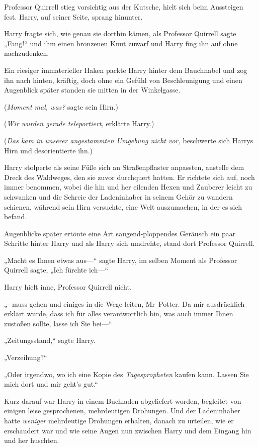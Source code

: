 {Professor Quirrell stieg vorsichtig aus der Kutsche, hielt sich beim Aussteigen fest. Harry, auf seiner Seite, sprang hinunter.

Harry fragte sich, wie genau sie dorthin kämen, als Professor Quirrell sagte „Fang!“ und ihm einen bronzenen Knut zuwarf und Harry fing ihn auf ohne nachzudenken.

Ein riesiger immaterieller Haken packte Harry hinter dem Bauchnabel und zog ihn nach hinten, kräftig, doch ohne ein Gefühl von Beschleunigung und einen Augenblick später standen sie mitten in der Winkelgasse.

(\emph{Moment mal, was?} sagte sein Hirn.)

(\emph{Wir wurden gerade teleportiert,} erklärte Harry.)

(\emph{Das kam in unserer angestammten Umgebung nicht vor,} beschwerte sich Harrys Hirn und desorientierte ihn.)

Harry stolperte als seine Füße sich an Straßenpflaster anpassten, anstelle dem Dreck des Waldweges, den sie zuvor durchquert hatten. Er richtete sich auf, noch immer benommen, wobei die hin und her eilenden Hexen und Zauberer leicht zu schwanken und die Schreie der Ladeninhaber in seinem Gehör zu wandern schienen, während sein Hirn versuchte, eine Welt auszumachen, in der es sich befand.

Augenblicke später ertönte eine Art saugend-ploppendes Geräusch ein paar Schritte hinter Harry und als Harry sich umdrehte, stand dort Professor Quirrell.

„Macht es Ihnen etwas aus—“ sagte Harry, im selben Moment als Professor Quirrell sagte, „Ich fürchte ich—“

Harry hielt inne, Professor Quirrell nicht.

„- muss gehen und einiges in die Wege leiten, Mr~Potter. Da mir ausdrücklich erklärt wurde, dass ich für alles verantwortlich bin, was auch immer Ihnen zustoßen sollte, lasse ich Sie bei—“

„Zeitungsstand,“ sagte Harry.

„Verzeihung?“

„Oder irgendwo, wo ich eine Kopie des \emph{Tagespropheten} kaufen kann. Lassen Sie mich dort und mir geht's gut.“

Kurz darauf war Harry in einem Buchladen abgeliefert worden, begleitet von einigen leise gesprochenen, mehrdeutigen Drohungen. Und der Ladeninhaber hatte \emph{weniger} mehrdeutige Drohungen erhalten, danach zu urteilen, wie er erschaudert war und wie seine Augen nun zwischen Harry und dem Eingang hin und her huschten.

}
